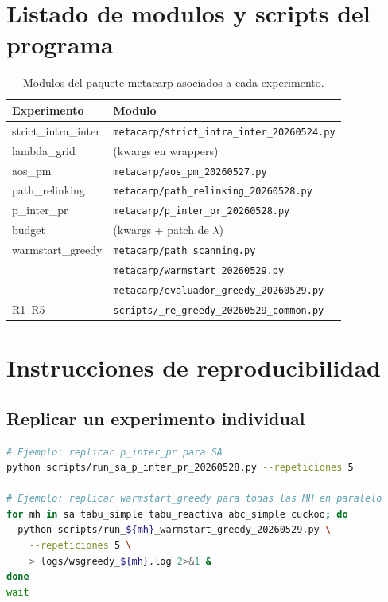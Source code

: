\appendix

\section{Listado de modulos y scripts del programa}

\begin{table}[h]
\centering
\caption{Modulos del paquete metacarp asociados a cada experimento.}
\small
\begin{tabular}{ll}
\toprule
Experimento & Modulo \\
\midrule
strict\_intra\_inter & \texttt{metacarp/strict\_intra\_inter\_20260524.py} \\
lambda\_grid & (kwargs en wrappers) \\
aos\_pm & \texttt{metacarp/aos\_pm\_20260527.py} \\
path\_relinking & \texttt{metacarp/path\_relinking\_20260528.py} \\
p\_inter\_pr & \texttt{metacarp/p\_inter\_pr\_20260528.py} \\
budget & (kwargs + patch de $\lambda$) \\
warmstart\_greedy & \texttt{metacarp/path\_scanning.py} \\
                  & \texttt{metacarp/warmstart\_20260529.py} \\
                  & \texttt{metacarp/evaluador\_greedy\_20260529.py} \\
R1--R5 & \texttt{scripts/\_re\_greedy\_20260529\_common.py} \\
\bottomrule
\end{tabular}
\end{table}

\section{Instrucciones de reproducibilidad}

\subsection{Replicar un experimento individual}

\begin{lstlisting}[language=bash]
# Ejemplo: replicar p_inter_pr para SA
python scripts/run_sa_p_inter_pr_20260528.py --repeticiones 5

# Ejemplo: replicar warmstart_greedy para todas las MH en paralelo
for mh in sa tabu_simple tabu_reactiva abc_simple cuckoo; do
  python scripts/run_${mh}_warmstart_greedy_20260529.py \
    --repeticiones 5 \
    > logs/wsgreedy_${mh}.log 2>&1 &
done
wait
\end{lstlisting}

